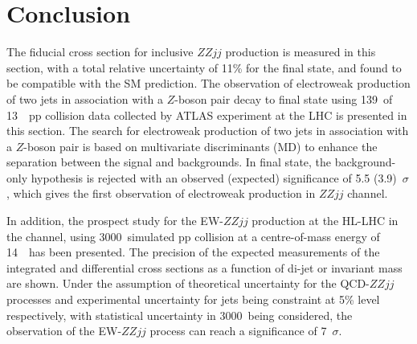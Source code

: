 \section{Conclusion}

The fiducial cross section for inclusive $ZZjj$ production is measured in this section, with a total relative uncertainty of 11\% for the \lllljj final state,
and found to be compatible with the SM prediction.
The observation of electroweak production of two jets in association with a $Z$-boson pair decay to \llll final state 
using 139~\ifb of 13~\tev~pp collision data collected by ATLAS experiment at the LHC is presented in this section.
The search for electroweak production of two jets in association with a $Z$-boson pair is based on multivariate discriminants (MD) to enhance the separation between the signal and backgrounds.
In \llll final state, the background-only hypothesis is rejected with an observed (expected) significance of 5.5 (3.9)~$\sigma$,
which gives the first observation of electroweak production in $ZZjj$ channel.

In addition, the prospect study for the EW-$ZZjj$ production at the HL-LHC in the \llll channel, using 3000~\ifb simulated pp collision at a centre-of-mass energy of 14~\tev~has been presented.
The precision of the expected measurements of the integrated and differential cross sections as a function of di-jet or \llll invariant mass are shown.
Under the assumption of theoretical uncertainty for the QCD-$ZZjj$ processes 
and experimental uncertainty for jets being constraint at 5\% level respectively, 
with statistical uncertainty in 3000~\ifb being considered, 
the observation of the EW-$ZZjj$ process can reach a significance of 7~$\sigma$.
